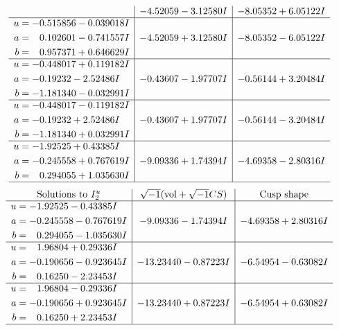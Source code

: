 \documentclass[1p]{elsarticle_modified}
\theoremstyle{definition}
\newcommand{\I}{\sqrt{-1}}
\begin{document}
$$\begin{array}{c|c|c}
 & -4.52059 - 3.12580 I & -8.05352 + 6.05122 I \\ \hline\begin{aligned}
u &= -0.515856 - 0.039018 I \\
a &= \phantom{-}0.102601 - 0.741557 I \\
b &= \phantom{-}0.957371 + 0.646629 I\end{aligned}
 & -4.52059 + 3.12580 I & -8.05352 - 6.05122 I \\ \hline\begin{aligned}
u &= -0.448017 + 0.119182 I \\
a &= -0.19232 - 2.52486 I \\
b &= -1.181340 - 0.032991 I\end{aligned}
 & -0.43607 - 1.97707 I & -0.56144 + 3.20484 I \\ \hline\begin{aligned}
u &= -0.448017 - 0.119182 I \\
a &= -0.19232 + 2.52486 I \\
b &= -1.181340 + 0.032991 I\end{aligned}
 & -0.43607 + 1.97707 I & -0.56144 - 3.20484 I \\ \hline\begin{aligned}
u &= -1.92525 + 0.43385 I \\
a &= -0.245558 + 0.767619 I \\
b &= \phantom{-}0.294055 + 1.035630 I\end{aligned}
 & -9.09336 + 1.74394 I & -4.69358 - 2.80316 I\\
 \hline 
 \end{array}$$\newpage$$\begin{array}{c|c|c}  
\text{Solutions to }I^u_{2}& \I (\text{vol} + \sqrt{-1}CS) & \text{Cusp shape}\\
 \hline 
\begin{aligned}
u &= -1.92525 - 0.43385 I \\
a &= -0.245558 - 0.767619 I \\
b &= \phantom{-}0.294055 - 1.035630 I\end{aligned}
 & -9.09336 - 1.74394 I & -4.69358 + 2.80316 I \\ \hline\begin{aligned}
u &= \phantom{-}1.96804 + 0.29336 I \\
a &= -0.190656 - 0.923645 I \\
b &= \phantom{-}0.16250 - 2.23453 I\end{aligned}
 & -13.23440 - 0.87223 I & -6.54954 - 0.63082 I \\ \hline\begin{aligned}
u &= \phantom{-}1.96804 - 0.29336 I \\
a &= -0.190656 + 0.923645 I \\
b &= \phantom{-}0.16250 + 2.23453 I\end{aligned}
 & -13.23440 + 0.87223 I & -6.54954 + 0.63082 I\\
 \hline 
 \end{array}$$\newpage
\end{document}
